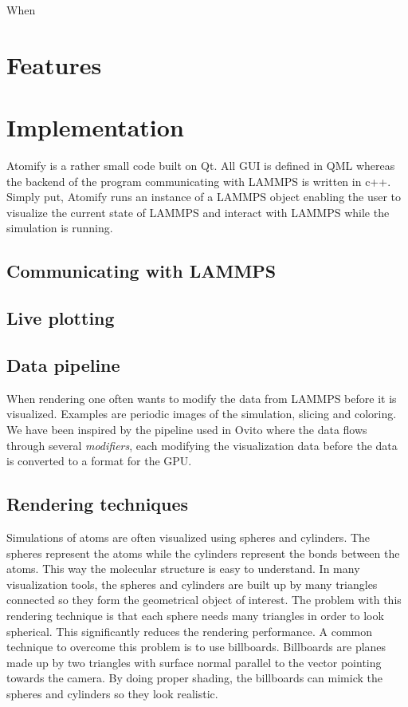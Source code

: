 \documentclass[aps,pre,twocolumn,letterpaper,floatfix,showpacs]{revtex4}
\begin{document}
When 


\section{Features}


\section{Implementation}
Atomify is a rather small code built on Qt. All GUI is defined in QML whereas the backend of the program communicating with LAMMPS is written in c++. Simply put, Atomify runs an instance of a LAMMPS object enabling the user to visualize the current state of LAMMPS and interact with LAMMPS while the simulation is running. 

\subsection{Communicating with LAMMPS}

\subsection{Live plotting}

\subsection{Data pipeline}
When rendering one often wants to modify the data from LAMMPS before it is visualized. Examples are periodic images of the simulation, slicing and coloring. We have been inspired by the pipeline used in Ovito where the data flows through several \textit{modifiers}, each modifying the visualization data before the data is converted to a format for the GPU.

\subsection{Rendering techniques}
Simulations of atoms are often visualized using spheres and cylinders. The spheres represent the atoms while the cylinders represent the bonds between the atoms. This way the molecular structure is easy to understand. In many visualization tools, the spheres and cylinders are built up by many triangles connected so they form the geometrical object of interest. The problem with this rendering technique is that each sphere needs many triangles in order to look spherical. This significantly reduces the rendering performance. A common technique to overcome this problem is to use billboards. Billboards are planes made up by two triangles with surface normal parallel to the vector pointing towards the camera. By doing proper shading, the billboards can mimick the spheres and cylinders so they look realistic.
\end{document}
